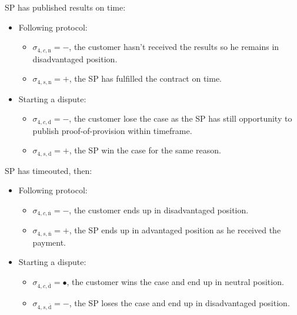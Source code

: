 \documentclass{ieeeaccess}
\begin{document}
SP has published results on time:

\begin{itemize}
\item
  Following protocol:

  \begin{itemize}
  
  \item
    \(\sigma_{4, c, \mathrm{n}} = -\), the customer hasn't received the results so he remains in disadvantaged position.
  \item
    \(\sigma_{4, s, \mathrm{n}} = +\), the SP has fulfilled the contract on time.
  \end{itemize}
\item
  Starting a dispute:

  \begin{itemize}
  
  \item
    \(\sigma_{4, c, \mathrm{d}} = -\), the customer lose the case as the
    SP has still opportunity to publish proof-of-provision within
    timeframe.
  \item
    \(\sigma_{4, s, \mathrm{d}} = +\), the SP win the case for the same
    reason.
  \end{itemize}
\end{itemize}

SP has timeouted, then:

\begin{itemize}
\item
  Following protocol:

  \begin{itemize}
  
  \item
    \(\sigma_{4, c, \overline{\mathrm{n}}} = -\), the customer ends up in
    disadvantaged position.
  \item
    \(\sigma_{4, s, \overline{\mathrm{n}}} = +\), the SP ends up in
    advantaged position as he received the payment.
  \end{itemize}
\item
  Starting a dispute:

  \begin{itemize}
  
  \item
    \(\sigma_{4, c, \overline{\mathrm{d}}} = •\), the customer wins the
    case and end up in neutral position.
  \item
    \(\sigma_{4, s, \overline{\mathrm{d}}} = -\), the SP loses the case
    and end up in disadvantaged position.
  \end{itemize}
\end{itemize}
\end{document}
